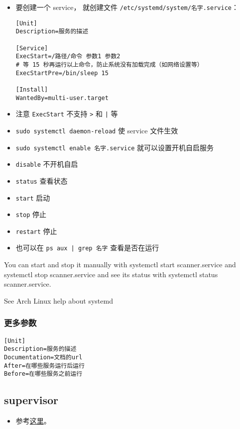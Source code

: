 
\begin{issues}
\issueDraft
\end{issues}

\begin{itemize}
\item 要创建一个 service， 就创建文件 \verb|/etc/systemd/system/名字.service|：
\begin{lstlisting}[language=none,caption=名字.service]
[Unit]
Description=服务的描述

[Service]
ExecStart=/路径/命令 参数1 参数2
# 等 15 秒再运行以上命令，防止系统没有加载完成（如网络设置等）
ExecStartPre=/bin/sleep 15

[Install]
WantedBy=multi-user.target
\end{lstlisting}
\item 注意 \verb|ExecStart| 不支持 \verb|>| 和 \verb`|` 等
\item \verb|sudo systemctl daemon-reload| 使 service 文件生效
\item \verb|sudo systemctl enable 名字.service| 就可以设置开机自启服务
\item \verb|disable| 不开机自启
\item \verb|status| 查看状态
\item \verb|start| 启动
\item \verb|stop| 停止
\item \verb|restart| 停止
\item 也可以在 \verb`ps aux | grep 名字` 查看是否在运行
\end{itemize}

You can start and stop it manually with systemctl start scanner.service and systemctl stop scanner.service and see its status with systemctl status scanner.service.

See Arch Linux help about systemd

\subsubsection{更多参数}
\begin{lstlisting}[language=none,caption=名字.service]
[Unit]
Description=服务的描述
Documentation=文档的url
After=在哪些服务运行后运行
Before=在哪些服务之前运行
\end{lstlisting}


\subsection{supervisor}
\begin{itemize}
\item 参考\href{https://www.digitalocean.com/community/tutorials/how-to-install-and-manage-supervisor-on-ubuntu-and-debian-vps}{这里}。
\end{itemize}
